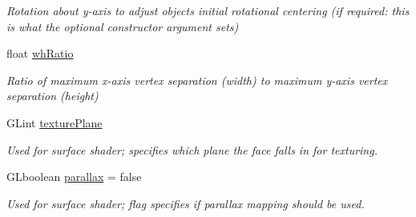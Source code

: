 \begin{DoxyCompactItemize}
\begin{DoxyCompactList}\small\item\em Rotation about y-\/axis to adjust objects initial rotational centering (if required\+: this is what the optional constructor argument sets) \end{DoxyCompactList}\item 
float \hyperlink{class_obj_g_p_u_data_aa95922f6ad01e53e638ae6dd1fa698a5}{wh\+Ratio}\hypertarget{class_obj_g_p_u_data_aa95922f6ad01e53e638ae6dd1fa698a5}{}\label{class_obj_g_p_u_data_aa95922f6ad01e53e638ae6dd1fa698a5}

\begin{DoxyCompactList}\small\item\em Ratio of maximum x-\/axis vertex separation (width) to maximum y-\/axis vertex separation (height) \end{DoxyCompactList}\item 
G\+Lint \hyperlink{class_obj_g_p_u_data_a62d87728ab45fca188c17848dafc2a53}{texture\+Plane}\hypertarget{class_obj_g_p_u_data_a62d87728ab45fca188c17848dafc2a53}{}\label{class_obj_g_p_u_data_a62d87728ab45fca188c17848dafc2a53}

\begin{DoxyCompactList}\small\item\em Used for surface shader; specifies which plane the face falls in for texturing. \end{DoxyCompactList}\item 
G\+Lboolean \hyperlink{class_obj_g_p_u_data_a5e69ae6ae47498eed2ca227c34783164}{parallax} = false\hypertarget{class_obj_g_p_u_data_a5e69ae6ae47498eed2ca227c34783164}{}\label{class_obj_g_p_u_data_a5e69ae6ae47498eed2ca227c34783164}

\begin{DoxyCompactList}\small\item\em Used for surface shader; flag specifies if parallax mapping should be used. \end{DoxyCompactList}\end{DoxyCompactItemize}
